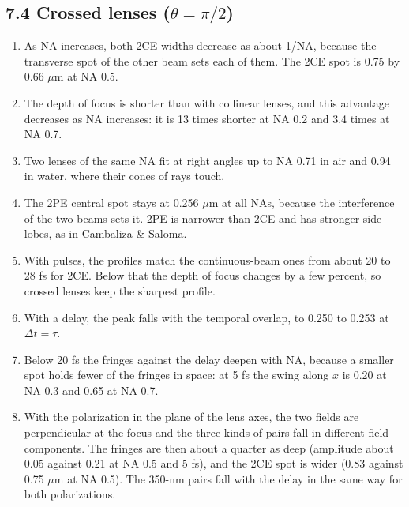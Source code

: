 \documentclass[10pt]{article}
\begin{document}
\subsection*{7.4 Crossed lenses ($\theta = \pi/2$)}
\begin{enumerate}
\item As NA increases, both 2CE widths decrease as about 1/NA, because the transverse spot of the other beam sets
each of them. The 2CE spot is 0.75 by 0.66 $\mu$m at NA 0.5.
\item The depth of focus is shorter than with collinear lenses, and this advantage decreases as NA increases: it
is 13 times shorter at NA 0.2 and 3.4 times at NA 0.7.
\item Two lenses of the same NA fit at right angles up to NA 0.71 in air and 0.94 in water, where their cones of
rays touch.
\item The 2PE central spot stays at 0.256 $\mu$m at all NAs, because the interference of the two beams sets it.
2PE is narrower than 2CE and has stronger side lobes, as in Cambaliza \& Saloma.
\item With pulses, the profiles match the continuous-beam ones from about 20 to 28 fs for 2CE. Below that the
depth of focus changes by a few percent, so crossed lenses keep the sharpest profile.
\item With a delay, the peak falls with the temporal overlap, to 0.250 to 0.253 at $\Delta t = \tau$.
\item Below 20 fs the fringes against the delay deepen with NA, because a smaller spot holds fewer of the fringes
in space: at 5 fs the swing along $x$ is 0.20 at NA 0.3 and 0.65 at NA 0.7.
\item With the polarization in the plane of the lens axes, the two fields are perpendicular at the focus and
the three kinds of pairs fall in different field components. The fringes are then about a quarter as deep
(amplitude about 0.05 against 0.21 at NA 0.5 and 5 fs), and the 2CE spot is wider (0.83 against 0.75 $\mu$m at
NA 0.5). The 350-nm pairs fall with the delay in the same way for both polarizations.
\end{enumerate}
\end{document}
